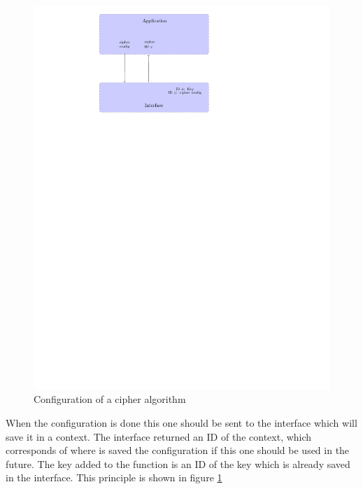 \begin{figure}[!ht]
\centering
\includegraphics[trim=8.5cm 20cm 12.5cm 0cm]{figures/cipher_example_config.pdf}
\caption{Configuration of a cipher algorithm}
\label{fig:gci_cipher_config}
\end{figure}

When the configuration is done this one should be sent to the interface
which will save it in a context.
The interface returned an ID of the context, which corresponds of where is saved
the configuration if this one should be used in the future.
The key added to the function is an ID of the key which is already saved in
the interface.
This principle is shown in figure \ref{fig:gci_cipher_config}

